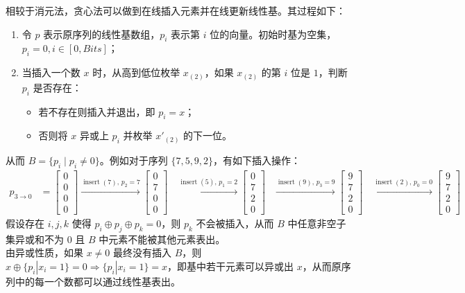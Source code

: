 \documentclass[12pt,a4paper]{article}
\begin{document}
相较于消元法，贪心法可以做到在线插入元素并在线更新线性基。其过程如下：
\begin{enumerate}
	\item 令 $p$ 表示原序列的线性基数组，$p_i$ 表示第 $i$ 位的向量。初始时基为空集，$p_i=0,i\in[0,Bits]$；
	\item 当插入一个数 $x$ 时，从高到低位枚举 $x_{(2)}$，如果 $x_{(2)}$ 的第 $i$ 位是 $1$，判断 $p_i$ 是否存在：
	\begin{itemize}
		\item 若不存在则插入并退出，即 $p_i=x$；
		\item 否则将 $x$ 异或上 $p_i$ 并枚举 $x'_{(2)}$ 的下一位。
	\end{itemize}
\end{enumerate}
从而 $B=\{p_i\mid p_i\ne0\}$。例如对于序列 $\{7,5,9,2\}$，有如下插入操作：
\begin{align*}
	p_{3\rightarrow0} &=
	\begin{bmatrix}0 \\ 0 \\ 0 \\ 0\end{bmatrix}
	\xrightarrow{\operatorname{insert}(7),\,p_2=7}
	\begin{bmatrix}0 \\ 7 \\ 0 \\ 0\end{bmatrix}
	&\xrightarrow{\operatorname{insert}(5),\,p_1=2}
	\begin{bmatrix}0 \\ 7 \\ 2 \\ 0\end{bmatrix}
	&\xrightarrow{\operatorname{insert}(9),\,p_3=9}
	\begin{bmatrix}9 \\ 7 \\ 2 \\ 0\end{bmatrix}
	&\xrightarrow{\operatorname{insert}(2),\,p_0=0}
	\begin{bmatrix}9 \\ 7 \\ 2 \\ 0\end{bmatrix}
\end{align*}
假设存在 $i,j,k$ 使得 $p_i\oplus p_j\oplus p_k=0$，则 $p_k$ 不会被插入，从而 $B$ 中任意非空子集异或和不为 $0$ 且 $B$ 中元素不能被其他元素表出。\\
由异或性质，如果 $x\ne0$ 最终没有插入 $B$，则 $x\oplus \{p_i|x_i=1\}=0\Rightarrow\{p_i|x_i=1\}=x$，即基中若干元素可以异或出 $x$，从而原序列中的每一个数都可以通过线性基表出。\\
\end{document}
